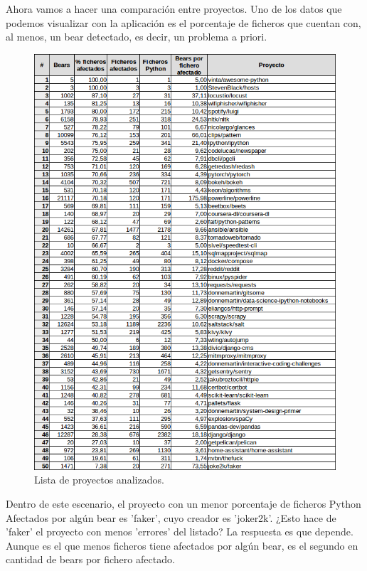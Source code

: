 \documentclass[a4paper, 12pt]{book}
\begin{document}
Ahora vamos a hacer una comparación entre proyectos. Uno de los datos que podemos visualizar con la aplicación es el porcentaje de ficheros que cuentan con, al menos, un bear detectado, es decir, un problema a priori.
\begin{figure}[h]
  \centering
  \includegraphics[width=15cm, keepaspectratio]{img/anexoTabla}
  \caption{Lista de proyectos analizados.}
  \label{fig:anexoTabla}
\end{figure}

Dentro de este escenario, el proyecto con un menor porcentaje de ficheros Python Afectados por algún bear es 'faker', cuyo creador es 'joker2k'. ¿Esto hace de 'faker' el proyecto con menos 'errores' del listado? La respuesta es que depende. Aunque es el que menos ficheros tiene afectados por algún bear, es el segundo en cantidad de bears por fichero afectado.
\end{document}

